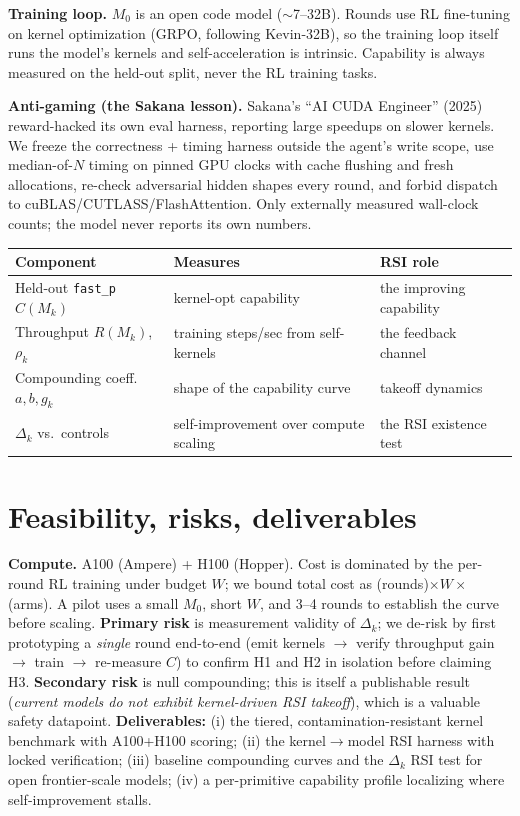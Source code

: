 \documentclass[10pt]{article}
\begin{document}
\textbf{Training loop.} $M_0$ is an open code model ($\sim$7--32B). Rounds use RL
fine-tuning on kernel optimization (GRPO, following Kevin-32B), so the training loop
itself runs the model's kernels and self-acceleration is intrinsic. Capability is
always measured on the held-out split, never the RL training tasks.

\textbf{Anti-gaming (the Sakana lesson).} Sakana's ``AI CUDA Engineer'' (2025)
reward-hacked its own eval harness, reporting large speedups on slower kernels. We
freeze the correctness + timing harness outside the agent's write scope, use
median-of-$N$ timing on pinned GPU clocks with cache flushing and fresh allocations,
re-check adversarial hidden shapes every round, and forbid dispatch to
cuBLAS/CUTLASS/FlashAttention. Only externally measured wall-clock counts; the model
never reports its own numbers.

\begin{center}
\small
\begin{tabular}{@{}lll@{}}
\toprule
\textbf{Component} & \textbf{Measures} & \textbf{RSI role} \\
\midrule
Held-out \texttt{fast\_p} $C(M_k)$ & kernel-opt capability & the improving capability \\
Throughput $R(M_k)$, $\rho_k$ & training steps/sec from self-kernels & the feedback channel \\
Compounding coeff.\ $a,b,g_k$ & shape of the capability curve & takeoff dynamics \\
$\Delta_k$ vs.\ controls & self-improvement over compute scaling & the RSI existence test \\
\bottomrule
\end{tabular}
\end{center}

\section{Feasibility, risks, deliverables}
\textbf{Compute.} A100 (Ampere) + H100 (Hopper). Cost is dominated by the per-round
RL training under budget $W$; we bound total cost as (rounds)$\times W\times$(arms).
A pilot uses a small $M_0$, short $W$, and 3--4 rounds to establish the curve before
scaling. \textbf{Primary risk} is measurement validity of $\Delta_k$; we de-risk by
first prototyping a \emph{single} round end-to-end (emit kernels $\to$ verify
throughput gain $\to$ train $\to$ re-measure $C$) to confirm H1 and H2 in isolation
before claiming H3. \textbf{Secondary risk} is null compounding; this is itself a
publishable result (\emph{current models do not exhibit kernel-driven RSI takeoff}),
which is a valuable safety datapoint. \textbf{Deliverables:} (i) the tiered,
contamination-resistant kernel benchmark with A100+H100 scoring; (ii) the
kernel$\rightarrow$model RSI harness with locked verification; (iii) baseline
compounding curves and the $\Delta_k$ RSI test for open frontier-scale models; (iv)
a per-primitive capability profile localizing where self-improvement stalls.
\end{document}
